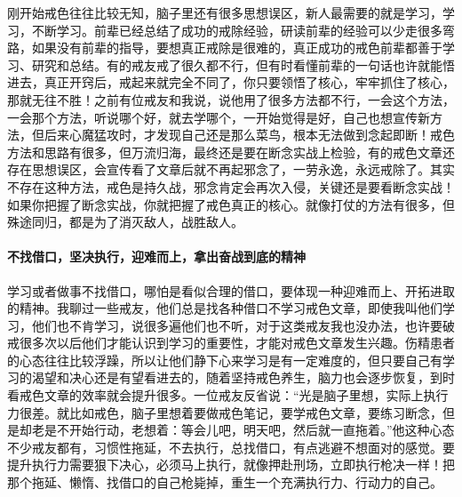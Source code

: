 刚开始戒色往往比较无知，脑子里还有很多思想误区，新人最需要的就是学习，学习，不断学习。前辈已经总结了成功的戒除经验，研读前辈的经验可以少走很多弯路，如果没有前辈的指导，要想真正戒除是很难的，真正成功的戒色前辈都善于学习、研究和总结。有的戒友戒了很久都不行，但有时看懂前辈的一句话也许就能悟进去，真正开窍后，戒起来就完全不同了，你只要领悟了核心，牢牢抓住了核心，那就无往不胜！之前有位戒友和我说，说他用了很多方法都不行，一会这个方法，一会那个方法，听说哪个好，就去学哪个，一开始觉得是好，自己也想宣传新方法，但后来心魔猛攻时，才发现自己还是那么菜鸟，根本无法做到念起即断！戒色方法和思路有很多，但万流归海，最终还是要在断念实战上检验，有的戒色文章还存在思想误区，会宣传看了文章后就不再起邪念了，一劳永逸，永远戒除了。其实不存在这种方法，戒色是持久战，邪念肯定会再次入侵，关键还是要看断念实战！如果你把握了断念实战，你就把握了戒色真正的核心。就像打仗的方法有很多，但殊途同归，都是为了消灭敌人，战胜敌人。

\paragraph{不找借口，坚决执行，迎难而上，拿出奋战到底的精神}

学习或者做事不找借口，哪怕是看似合理的借口，要体现一种迎难而上、开拓进取的精神。我聊过一些戒友，他们总是找各种借口不学习戒色文章，即使我叫他们学习，他们也不肯学习，说很多遍他们也不听，对于这类戒友我也没办法，也许要破戒很多次以后他们才能认识到学习的重要性，才能对戒色文章发生兴趣。伤精患者的心态往往比较浮躁，所以让他们静下心来学习是有一定难度的，但只要自己有学习的渴望和决心还是有望看进去的，随着坚持戒色养生，脑力也会逐步恢复，到时看戒色文章的效率就会提升很多。一位戒友反省说：“光是脑子里想，实际上执行力很差。就比如戒色，脑子里想着要做戒色笔记，要学戒色文章，要练习断念，但是却老是不开始行动，老想着：等会儿吧，明天吧，然后就一直拖着。”他这种心态不少戒友都有，习惯性拖延，不去执行，总找借口，有点逃避不想面对的感觉。要提升执行力需要狠下决心，必须马上执行，就像押赴刑场，立即执行枪决一样！把那个拖延、懒惰、找借口的自己枪毙掉，重生一个充满执行力、行动力的自己。

